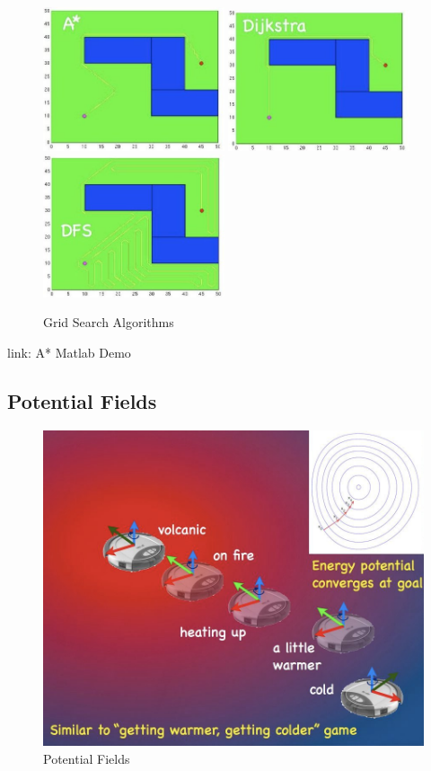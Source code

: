 \begin{figure}
\centerline{
\mbox{\includegraphics[width=2.10in]{figures/7_grid1.jpg}}
\mbox{\includegraphics[width=2.10in]{figures/7_grid2.jpg}}
\mbox{\includegraphics[width=2.10in]{figures/7_grid3.jpg}}
}
\caption{Grid Search Algorithms}
\end{figure}

link: A* Matlab Demo

\subsection{Potential Fields}

\begin{figure}[!h]
\centering
\includegraphics[width=0.6\columnwidth]{figures/7_potential1.jpg}
\caption{Potential Fields}
\end{figure}

